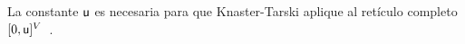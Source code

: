 \fi
La constante $\mathsf{u}$ es necesaria para que Knaster-Tarski aplique al retículo completo $[0,\mathsf{u}]^V$~\cite{CastroDDP22}.



